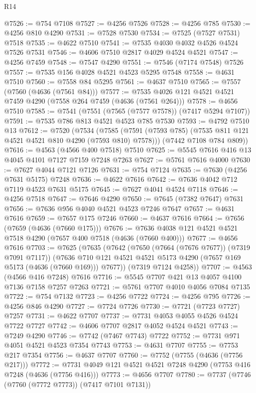 \begin{lexlean}{R14}
\begin{coremodule}
@7526 := @754 @7108
@7527 := @4256 @7526
@7528 := @4256 @785
@7530 := @4256 @810 @4290
@7531 := @7528 @7530
@7534 := @7525 (@7527 @7531) @7518
@7535 := @4622 @7510
@7541 := @7535 @4030 @4032 @4526 @4524 @7526 @7531
@7546 := @4606 @7510 @2817 @4029 @4524 @4521
@7547 := @4256 @7459
@7548 := @7547 @4290
@7551 := @7546 (@7174 @7548) @7526
@7557 := @7535 @156 @4028 @4521 @4523 @5295 @7548
@7558 := @4631 @7510
@7560 := @7558 @84 @5295
@7561 := @4637 @7510
@7565 := @7557 (@7560 (@4636 (@7561 @84)))
@7577 := @7535 @4026 @121 @4521 @4521 @7459 @4290 (@7558 @264 @7459 (@4636 (@7561 @264)))
@7578 := @4656 @7510
@7585 := @7541 (@7551 (@7565 (@7577 @7578)) (@7417 @5294 @7107))
@7591 := @7535 @786 @813 @4521 @4523 @785 @7530
@7593 := @4792 @7510 @13
@7612 := @7520
    (@7534
      (@7585 (@7591 (@7593 @785) (@7535 @811 @121 @4521 @4521 @810 @4290 (@7593 @810) @7578)))
      (@7442 @7108 @784 @809))
@7616 := @4563 (@4566 @400 @7518) @7510
@7625 := @5545 @7616 @416 @13 @4045 @4101 @7127 @7159 @7248 @7263
@7627 := @5761 @7616 @4000
@7630 := @7627 @4044 @7121 @7126
@7631 := @754 @7124
@7635 := @7630 (@4256 @7631 @5175) @7248
@7636 := @4622 @7616
@7642 := @7636 @4042 @712 @7119 @4523 @7631 @5175
@7645 := @7627 @4041 @4524 @7118
@7646 := @4256 @7518
@7647 := @7646 @4290
@7650 := @7645 (@7382 @7647) @7631
@7656 := @7636 @956 @4040 @4521 @4523 @7246 @7647
@7657 := @4631 @7616
@7659 := @7657 @175 @7246
@7660 := @4637 @7616
@7664 := @7656 (@7659 (@4636 (@7660 @175)))
@7676 := @7636 @4038 @121 @4521 @4521 @7518 @4290 (@7657 @400 @7518 (@4636 (@7660 @400)))
@7677 := @4656 @7616
@7703 := @7625
    (@7635
      (@7642
        (@7650 (@7664 (@7676 @7677)) (@7319 @7091 @7117))
        (@7636 @710 @121 @4521 @4521 @5173 @4290 (@7657 @169 @5173 (@4636 (@7660 @169))) @7677))
      (@7319 @7124 @4258))
@7707 := @4563 (@4566 @416 @7248) @7616
@7716 := @5545 @7707 @421 @13 @4057 @4100 @7136 @7158 @7257 @7263
@7721 := @5761 @7707 @4010 @4056 @7084 @7135
@7722 := @754 @7132
@7723 := @4256 @7722
@7724 := @4256 @795
@7726 := @4256 @846 @4290
@7727 := @7724 @7726
@7730 := @7721 (@7723 @7727) @7257
@7731 := @4622 @7707
@7737 := @7731 @4053 @4055 @4526 @4524 @7722 @7727
@7742 := @4606 @7707 @2817 @4052 @4524 @4521
@7743 := @7249 @4290
@7746 := @7742 (@7467 @7743) @7722
@7752 := @7731 @971 @4051 @4521 @4523 @7354 @7743
@7753 := @4631 @7707
@7755 := @7753 @217 @7354
@7756 := @4637 @7707
@7760 := @7752 (@7755 (@4636 (@7756 @217)))
@7772 := @7731 @4049 @121 @4521 @4521 @7248 @4290 (@7753 @416 @7248 (@4636 (@7756 @416)))
@7773 := @4656 @7707
@7780 := @7737 (@7746 (@7760 (@7772 @7773)) (@7417 @7101 @7131))

\end{coremodule}
\end{lexlean}
